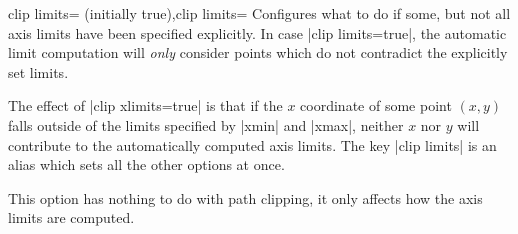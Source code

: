 \begin{pgfplotsxykeylist}{clip \x limits= (initially true),clip limits=}
    Configures what to do if some, but not all axis limits have been specified
    explicitly. In case |clip limits=true|, the automatic limit computation
    will \emph{only} consider points which do not contradict the explicitly set
    limits.

    The effect of |clip xlimits=true| is that if the $x$ coordinate of some
    point $(x,y)$ falls outside of the limits specified by |xmin| and |xmax|,
    neither $x$ nor $y$ will contribute to the automatically computed axis
    limits. The key |clip limits| is an alias which sets all the other options
    at once.

    This option has nothing to do with path clipping, it only affects how the
    axis limits are computed.
\end{pgfplotsxykeylist}

